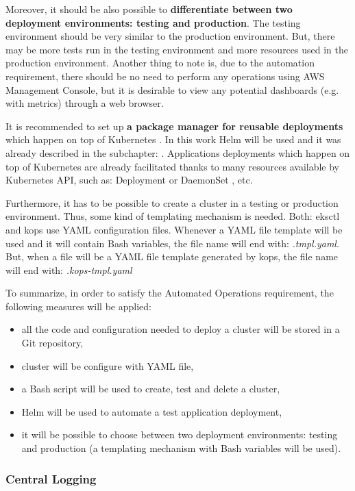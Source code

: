 Moreover, it should be also possible to \textbf{differentiate between two deployment environments: testing and production}. The testing environment should be very similar to the production environment. But, there may be more tests run in the testing environment and more resources used in the production environment. Another thing to note is, due to the automation requirement, there should be no need to perform any operations using AWS Management Console, but it is desirable to view any potential dashboards (e.g. with metrics) through a web browser.

It is recommended to set up \textbf{a package manager for reusable deployments} which happen on top of Kubernetes \cite{gruntwork-howto-blog}. In this work Helm will be used and it was already described in the subchapter: . Applications deployments which happen on top of Kubernetes are already facilitated thanks to many resources available by Kubernetes API, such as: Deployment \cite{k8s-resources-depl} or DaemonSet \cite{k8s-resources-ds}, etc.

Furthermore, it has to be possible to create a cluster in a testing or production environment. Thus, some kind of templating mechanism is needed. Both: eksctl and kops use YAML configuration files. Whenever a YAML file template will be used and it will contain Bash variables, the file name will end with: \textit{.tmpl.yaml}. But, when a file will be a YAML file template generated by kops, the file name will end with: \textit{.kops-tmpl.yaml}

To summarize, in order to satisfy the Automated Operations requirement, the following measures will be applied:
\begin{itemize}
\item all the code and configuration needed to deploy a cluster will be stored in a Git repository,
\item cluster will be configure with YAML file,
\item a Bash script will be used to create, test and delete a cluster,
\item Helm will be used to automate a test application deployment,
\item it will be possible to choose between two deployment environments: testing and production (a templating mechanism with Bash variables will be used).
\end{itemize}


\subsubsection{Central Logging}

